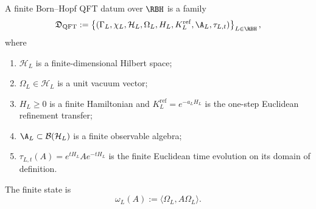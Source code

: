 \documentclass[12pt,a4paper]{article}
\begin{document}
\begin{definition}
\label{p12:def:finite-bh-qft-datum}
A finite Born--Hopf QFT datum over \(\RBH\) is a family
\begin{equation}
\label{p12:eq:finite-bh-qft-datum}
\mathfrak D_{\rm QFT}
:=
\left\{
(\Gamma_L,\chi_L,\mathcal H_L,\Omega_L,H_L,K_L^{\mathrm{ref}},\A_L,\tau_{L,t})
\right\}_{L\in\RBH},
\end{equation}
where
\begin{enumerate}[label=(\roman*), leftmargin=2em]
\item \(\mathcal H_L\) is a finite-dimensional Hilbert space;
\item \(\Omega_L\in\mathcal H_L\) is a unit vacuum vector;
\item \(H_L\ge0\) is a finite Hamiltonian and \(K_L^{\mathrm{ref}}=e^{-a_LH_L}\) is the one-step Euclidean refinement transfer;
\item \(\A_L\subset\mathcal B(\mathcal H_L)\) is a finite observable algebra;
\item \(\tau_{L,t}(A)=e^{tH_L}Ae^{-tH_L}\) is the finite Euclidean time evolution on its domain of definition.
\end{enumerate}
The finite state is
\begin{equation}
\label{p12:eq:finite-state}
\omega_L(A):=\langle\Omega_L,A\Omega_L\rangle.
\end{equation}
\end{definition}
\end{document}

